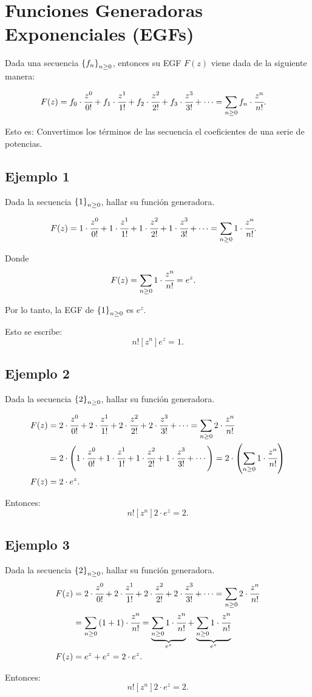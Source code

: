 \section{Funciones Generadoras Exponenciales (EGFs)}

Dada una secuencia $\left\{f_n\right\}_{n\geq0}$, entonces su EGF $F(z)$ viene dada de la siguiente manera:

\begin{align*}
F(z)&=f_0\cdot\cfrac{z^{0}}{0!}+f_1\cdot\cfrac{z^{1}}{1!}+f_2\cdot\cfrac{z^{2}}{2!}+f_3\cdot\cfrac{z^{3}}{3!}+\cdots=\sum_{n\geq0}{f_n\cdot \cfrac{z^{n}}{n!}}.
\end{align*}

Esto es: Convertimos los términos de las secuencia el coeficientes de una serie de potencias.

\subsection{Ejemplo 1}

Dada la secuencia $\left\{1\right\}_{n\geq0}$, hallar su función generadora.

\begin{align*}
F(z)&=1\cdot\cfrac{z^{0}}{0!}+1\cdot\cfrac{z^{1}}{1!}+1\cdot\cfrac{z^{2}}{2!}+1\cdot\cfrac{z^{3}}{3!}+\cdots=\sum_{n\geq0}{1\cdot \cfrac{z^{n}}{n!}}.
\end{align*}

Donde 
\begin{align*}
F(z)&=\sum_{n\geq0}{1\cdot\cfrac{z^{n}}{n!}}=e^z.
\end{align*}

Por lo tanto, la EGF de $\left\{1\right\}_{n\geq0}$ es $e^z$.

Esto se escribe:
$$n![z^n]e^z=1.$$

\subsection{Ejemplo 2}
Dada la secuencia $\left\{2\right\}_{n\geq0}$, hallar su función generadora.

\begin{align*}
F(z)&=2\cdot\cfrac{z^{0}}{0!}+2\cdot\cfrac{z^{1}}{1!}+2\cdot\cfrac{z^{2}}{2!}+2\cdot\cfrac{z^{3}}{3!}+\cdots=\sum_{n\geq0}{2\cdot \cfrac{z^{n}}{n!}}\\
&=2\cdot\left(1\cdot\cfrac{z^{0}}{0!}+1\cdot\cfrac{z^{1}}{1!}+1\cdot\cfrac{z^{2}}{2!}+1\cdot\cfrac{z^{3}}{3!}+\cdots\right)=2\cdot\left(\sum_{n\geq0}{1\cdot\cfrac{z^{n}}{n!}}\right)\\
F(z)&=2\cdot e^z.
\end{align*}

Entonces:
$$n![z^n]2\cdot e^z=2.$$

\subsection{Ejemplo 3}
Dada la secuencia $\left\{2\right\}_{n\geq0}$, hallar su función generadora.
%
\begin{align*}
F(z)&=2\cdot\cfrac{z^{0}}{0!}+2\cdot\cfrac{z^{1}}{1!}+2\cdot\cfrac{z^{2}}{2!}+2\cdot\cfrac{z^{3}}{3!}+\cdots=\sum_{n\geq0}{2\cdot \cfrac{z^{n}}{n!}}\\
&=
\sum_{n\geq0}{(1+1)\cdot \cfrac{z^{n}}{n!}}=\underset{e^z}{\underbrace{\sum_{n\geq0}{1\cdot \cfrac{z^{n}}{n!}}}}+\underset{e^z}{\underbrace{\sum_{n\geq0}{1\cdot \cfrac{z^{n}}{n!}}}}\\
F(z)&=e^z+e^z=2\cdot e^z.
\end{align*}

Entonces:
$$n![z^n]2\cdot e^z=2.$$